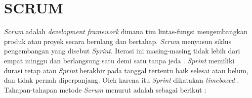 \section{SCRUM}
\textit{Scrum} adalah \textit{development framework} dimana tim lintas-fungsi mengembangkan produk atau proyek secara berulang dan bertahap. \textit{Scrum} menyusun siklus pengembangan yang disebut \textit{Sprint}. Iterasi ini masing-masing tidak lebih dari empat minggu dan berlangsung satu demi satu tanpa jeda \citep{deemer2012lightweight}. \textit{Sprint} memiliki durasi tetap atau \textit{Sprint} berakhir pada tanggal tertentu baik selesai atau belum, dan tidak pernah diperpanjang. Oleh karena itu \textit{Sprint} dikatakan \textit{timeboxed} \citep{schwaber2011scrum}. Tahapan-tahapan metode \textit{Scrum} menurut \citep{schwaber2011scrum} adalah sebagai berikut :

